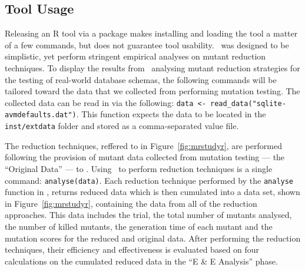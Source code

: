 \subsection{Tool Usage}





Releasing an R tool via a package makes installing and loading the tool a matter of a few commands,
but does not guarantee tool usability. \mr~was designed to be simplistic, yet perform stringent
empirical analyses on mutant reduction techniques. To display the results from \mr~analysing mutant
reduction strategies for the testing of real-world database schemas, the following commands will be
tailored toward the data that we collected from performing mutation testing. The collected data can
be read in via the following: {\small\texttt{data <- read\_data("sqlite-avmdefaults.dat")}}. This
function expects the data to be located in the \texttt{inst/extdata} folder and stored as a
comma-separated value file.






The reduction techniques, reffered to in Figure~\ref{fig:mrstudyr}, are performed following the provision
of mutant data collected from mutation testing --- the ``Original Data'' --- to \mr. Using \mr~to perform
reduction techniques is a single command: \texttt{analyse(data)}. Each reduction technique performed by
the \texttt{analyse} function in \mr, returns reduced data which is then cumulated into a data set, shown
in Figure~\ref{fig:mrstudyr}, containing the data from all of the reduction approaches. This data includes
the trial, the total number of mutants analysed, the number of killed mutants, the generation time of each
mutant and the mutation scores for the reduced and original data. After performing the reduction techniques,
their efficiency and effectiveness is evaluated based on four calculations on the cumulated reduced data in
the ``E \& E Analysis'' phase.

